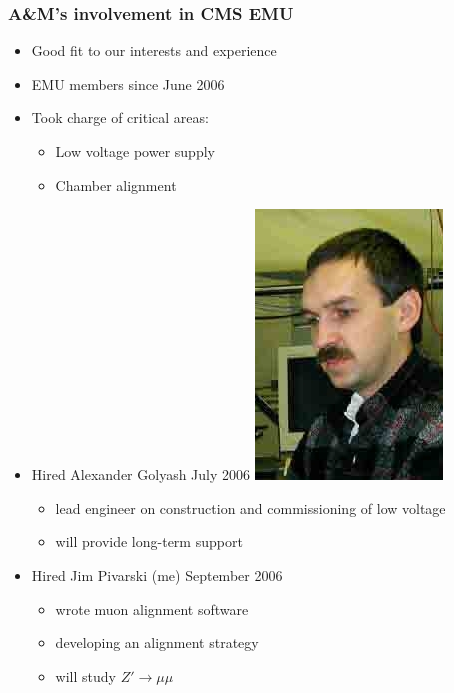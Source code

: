 \documentclass[compress]{beamer}
\begin{document}
\begin{frame}
\frametitle{A\&M's involvement in CMS EMU}
\begin{itemize}\setlength{\itemsep}{0.25 cm}
  \item Good fit to our interests and experience
  \item EMU members since June 2006
  \item Took charge of critical areas:
  \begin{itemize}
    \item Low voltage power supply
    \item Chamber alignment
  \end{itemize}
    \vspace{-3.25 cm}
  \item<2> Hired Alexander Golyash July 2006 \hfill\includegraphics[width=2.5 cm]{plots/sasha2.png}
  \begin{itemize}
    \item lead engineer on construction and commissioning of low voltage
    \item will provide long-term support
  \end{itemize}
  \item<2> Hired Jim Pivarski (me) September 2006
  \begin{itemize}
    \item wrote muon alignment software
    \item developing an alignment strategy
    \item will study $Z' \to \mu\mu$
  \end{itemize}
\end{itemize}
\end{frame}
\end{document}
